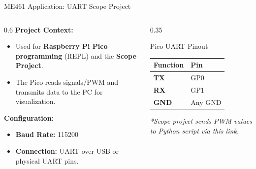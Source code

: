 \begin{frame}{ME461 Application: UART Scope Project}
\begin{columns}
    \begin{column}{0.6\textwidth}
        \textbf{Project Context:}
        \begin{itemize}
            \item Used for \textbf{Raspberry Pi Pico programming} (REPL) and the \textbf{Scope Project}.
            \item The Pico reads signals/PWM and transmits data to the PC for visualization.
        \end{itemize}
        
        \vspace{0.2cm}
        \textbf{Configuration:}
        \begin{itemize}
            \item \textbf{Baud Rate:} 115200
            \item \textbf{Connection:} UART-over-USB or physical UART pins.
        \end{itemize}
    \end{column}
    
    \begin{column}{0.35\textwidth}
        \begin{block}{Pico UART Pinout}
        \centering
        \begin{tabular}{ll}
        \toprule
        \textbf{Function} & \textbf{Pin} \\
        \midrule
        \textbf{TX} & GP0 \\
        \textbf{RX} & GP1 \\
        \textbf{GND} & Any GND \\
        \bottomrule
        \end{tabular}
        \end{block}
        
        \vspace{0.2cm}
        \footnotesize \textit{*Scope project sends PWM values to Python script via this link.}
    \end{column}
\end{columns}
\end{frame}


